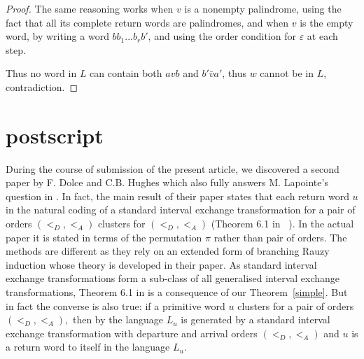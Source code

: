 \documentclass[12pt,a4paper]{amsart}
\begin{document}
\begin{proof}
The same reasoning works when $v$ is a nonempty palindrome, using the fact that all its complete return words are palindromes, and when  $v$ is the empty word, by writing  a word $bb_1...b_rb'$, and using the order condition for $\varepsilon$ at each step. 

Thus no word in $L$ can contain both $avb$ and $b'\bar va'$, thus $w$ cannot be  in $L$, contradiction. \end{proof}


\section{postscript} During the course of submission of the present article, we discovered a second paper by F. Dolce and C.B. Hughes \cite{d2} which also fully answers  M. Lapointe's question in \cite{lap}. In fact, the main result of their paper states that each return word $u$ in the natural coding of a standard interval exchange transformation for a pair of orders $(<_D,<_A)$ clusters for  $(<_D,<_A)$  (Theorem 6.1 in ~\cite{d2}).  In the actual paper it is stated in terms of the permutation $\pi$ rather than pair of orders. The methods are  different as they rely on an extended form of branching Rauzy induction whose theory is developed in their paper. As standard interval exchange transformations form a sub-class of all generalised  interval exchange transformations, Theorem 6.1 in \cite{d2} is a consequence of our Theorem~\ref{simple}. But in fact the converse is also true: if a primitive word $u$ clusters for a pair of orders $(<_D,<_A),$  then by \cite{fz4} the language $L_u$ is generated by a standard interval exchange transformation with departure and arrival orders $(<_D,<_A)$ and $u$ is a return word to itself in the language $L_u.$
\end{document}
